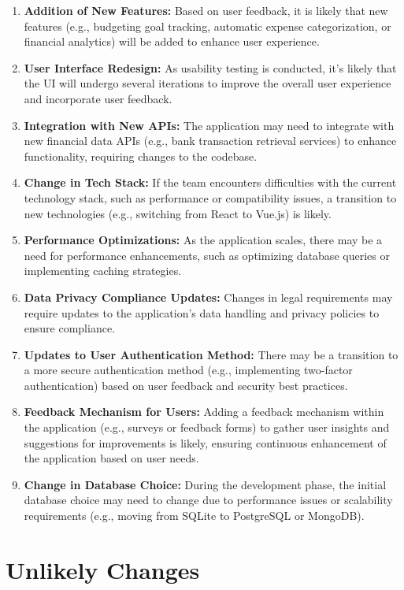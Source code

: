 \documentclass[12pt]{article}
\begin{document}
\begin{enumerate}[label=LC\arabic*]
	\item\textbf{Addition of New Features:} Based on user feedback, it is likely
	that new features (e.g., budgeting goal tracking, automatic expense
	categorization, or financial analytics) will be added to enhance user
	experience.
	\item\textbf{User Interface Redesign:} As usability testing is conducted, it's
	likely that the UI will undergo several iterations to improve the overall user
	experience and incorporate user feedback.
	\item \textbf{Integration with New APIs:} The application may need to
	integrate with new financial data APIs (e.g., bank transaction retrieval
	services) to enhance functionality, requiring changes to the codebase.
	\item \textbf{Change in Tech Stack:} If the team encounters difficulties with
	the current technology stack, such as performance or compatibility issues, a
	transition to new technologies (e.g., switching from React to Vue.js) is
	likely.
	\item \textbf{Performance Optimizations:} As the application scales, there may
	be a need for performance enhancements, such as optimizing database queries or
	implementing caching strategies.
	\item\textbf{Data Privacy Compliance Updates:} Changes in legal requirements
	may require updates to the application's data handling and privacy policies to
	ensure compliance.
	\item\textbf{Updates to User Authentication Method:} There may be a transition
	to a more secure authentication method (e.g., implementing two-factor
	authentication) based on user feedback and security best practices.
	\item\textbf{Feedback Mechanism for Users:} Adding a feedback mechanism within
	the application (e.g., surveys or feedback forms) to gather user insights and
	suggestions for improvements is likely, ensuring continuous enhancement of the
	application based on user needs.
  \item \textbf{Change in Database Choice:} During the development phase, the
	initial database choice may need to change due to performance issues or
	scalability requirements (e.g., moving from SQLite to PostgreSQL or MongoDB).
\end{enumerate}

\newpage

\section{Unlikely Changes}    
\end{document}
